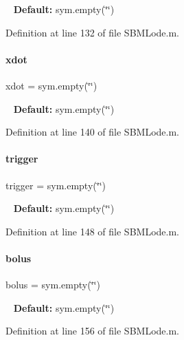 ~\newline
{\bfseries Default\+:} sym.\+empty(\char`\"{}\char`\"{}) 

Definition at line 132 of file S\+B\+M\+Lode.\+m.

\mbox{\label{class_s_b_m_lode_a914ee05b8f01d45602316710ca4b8a43}} 
\paragraph{\texorpdfstring{xdot}{xdot}}
{\footnotesize\ttfamily xdot = sym.\+empty(\char`\"{}\char`\"{})}

~\newline
{\bfseries Default\+:} sym.\+empty(\char`\"{}\char`\"{}) 

Definition at line 140 of file S\+B\+M\+Lode.\+m.

\mbox{\label{class_s_b_m_lode_ae194cb817eae4085f8023885100c68dd}} 
\paragraph{\texorpdfstring{trigger}{trigger}}
{\footnotesize\ttfamily trigger = sym.\+empty(\char`\"{}\char`\"{})}

~\newline
{\bfseries Default\+:} sym.\+empty(\char`\"{}\char`\"{}) 

Definition at line 148 of file S\+B\+M\+Lode.\+m.

\mbox{\label{class_s_b_m_lode_ab9227561ac246ee4b70f9e65c25ffda7}} 
\paragraph{\texorpdfstring{bolus}{bolus}}
{\footnotesize\ttfamily bolus = sym.\+empty(\char`\"{}\char`\"{})}

~\newline
{\bfseries Default\+:} sym.\+empty(\char`\"{}\char`\"{}) 

Definition at line 156 of file S\+B\+M\+Lode.\+m.

